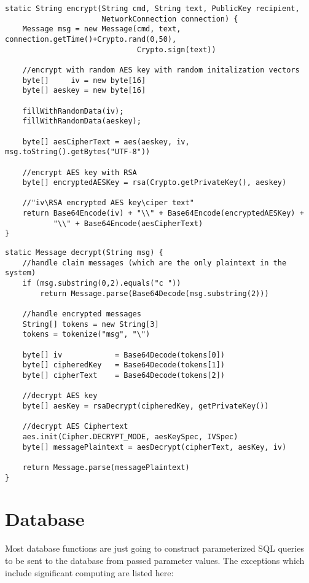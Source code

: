 \begin{lstlisting}
static String encrypt(String cmd, String text, PublicKey recipient,
                      NetworkConnection connection) {
    Message msg = new Message(cmd, text, connection.getTime()+Crypto.rand(0,50),
                              Crypto.sign(text))
    
    //encrypt with random AES key with random initalization vectors
    byte[]     iv = new byte[16]
    byte[] aeskey = new byte[16]
    
    fillWithRandomData(iv);
    fillWithRandomData(aeskey);
    
    byte[] aesCipherText = aes(aeskey, iv, msg.toString().getBytes("UTF-8"))
            
    //encrypt AES key with RSA
    byte[] encryptedAESKey = rsa(Crypto.getPrivateKey(), aeskey)
            
    //"iv\RSA encrypted AES key\ciper text"
    return Base64Encode(iv) + "\\" + Base64Encode(encryptedAESKey) +
           "\\" + Base64Encode(aesCipherText)
}
\end{lstlisting}

\begin{lstlisting}
static Message decrypt(String msg) {
    //handle claim messages (which are the only plaintext in the system)
    if (msg.substring(0,2).equals("c "))
        return Message.parse(Base64Decode(msg.substring(2)))
    
    //handle encrypted messages
    String[] tokens = new String[3]
    tokens = tokenize("msg", "\")
        
    byte[] iv            = Base64Decode(tokens[0])
    byte[] cipheredKey   = Base64Decode(tokens[1])
    byte[] cipherText    = Base64Decode(tokens[2])
            
    //decrypt AES key
    byte[] aesKey = rsaDecrypt(cipheredKey, getPrivateKey())
            
    //decrypt AES Ciphertext
    aes.init(Cipher.DECRYPT_MODE, aesKeySpec, IVSpec)
    byte[] messagePlaintext = aesDecrypt(cipherText, aesKey, iv)

    return Message.parse(messagePlaintext)
}
\end{lstlisting}

\section{Database}
Most database functions are just going to construct parameterized SQL queries to
be sent to the database from passed parameter values. The exceptions which
include significant computing are listed here:

